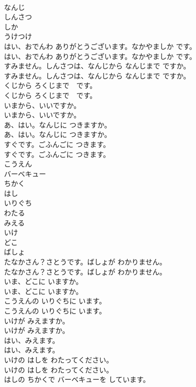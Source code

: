 \documentclass[8pt]{extreport}
\begin{document}
\begin{CJK}{UTF8}{min}
\\	なんじ
\\	しんさつ
\\	しか
\\	うけつけ
\\	はい、おでんわ ありがとうございます。なかやましか です。
\\	はい、おでんわ ありがとうございます。なかやましか です。
\\	すみません。しんさつは、なんじから なんじまで ですか。
\\	すみません。しんさつは、なんじから なんじまで ですか。
\\	くじから ろくじまで　です。
\\	くじから ろくじまで　です。
\\	いまから、いいですか。
\\	いまから、いいですか。
\\	あ、はい。なんじに つきますか。
\\	あ、はい。なんじに つきますか。
\\	すぐです。ごふんごに つきます。
\\	すぐです。ごふんごに つきます。
\\	こうえん
\\	バーベキュー
\\	ちかく
\\	はし
\\	いりぐち
\\	わたる
\\	みえる
\\	いけ
\\	どこ
\\	ばしょ
\\	たなかさん？さとうです。ばしょが わかりません。
\\	たなかさん？さとうです。ばしょが わかりません。
\\	いま、どこに いますか。
\\	いま、どこに いますか。
\\	こうえんの いりぐちに います。
\\	こうえんの いりぐちに います。
\\	いけが みえますか。
\\	いけが みえますか。
\\	はい、みえます。
\\	はい、みえます。
\\	いけの はしを わたってください。
\\	いけの はしを わたってください。
\\	はしの ちかくで バーベキューを しています。

\end{CJK}
\end{document}
